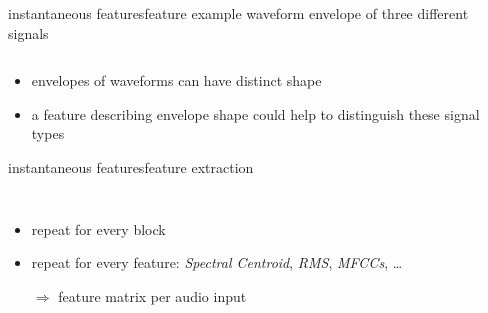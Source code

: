         \begin{frame}{instantaneous features}{feature example}
            waveform envelope of three different signals 
            
            
            \vspace{-2mm}
            \begin{columns}
                \centering
                    \hspace{8mm}
                \centering
                \centering
                    \hspace{-10mm}
            \end{columns}
            
            \bigskip
            \begin{itemize}
                \item<2->   envelopes of waveforms can have distinct shape
                \item<2->[$\Rightarrow$] a feature describing envelope shape could help to distinguish these signal types
            \end{itemize}
        \end{frame}

        \begin{frame}{instantaneous features}{feature extraction}
            \vspace{-5mm}
            \begin{columns}
            \vspace{-5mm}
                \begin{itemize}
                    \item   repeat for every block
                    \item   repeat for every feature: \textit{Spectral Centroid}, \textit{RMS}, \textit{MFCCs}, \ldots
                    \bigskip
                    \item[$\Rightarrow$] feature matrix per audio input
                \end{itemize}
            \end{columns}
        \end{frame}

